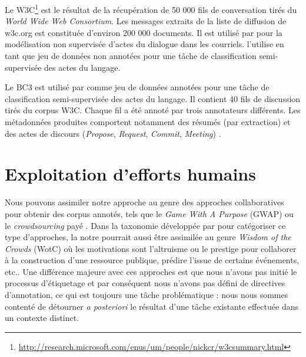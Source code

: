 Le W3C\footnote{\url{http://research.microsoft.com/enus/um/people/nickcr/w3csummary.html}} est le résultat de la récupération de 50 000 fils de conversation tirés du \textit{World Wide Web Consortium}. Les messages extraits de la liste de diffusion de w3c.org est constituée d'environ 200 000 documents. Il est utilisé par \cite{joty:2011:ijcai} pour la modélisation non supervisée d'actes du dialogue dans les courriels. \cite{joty:2013:sigdial} l'utilise en tant que jeu de données non annotées pour une tâche de classification semi-supervisée des actes du langage.

Le BC3 est utilisé par \cite{joty:2013:sigdial} comme jeu de données annotées pour une tâche de classification semi-supervisée des actes du langage. Il contient 40 fils de discussion tirés du corpus W3C. Chaque fil a été annoté par trois annotateurs différents. Les métadonnées produites comportent notamment des résumés (par extraction) et des actes de discours (\textit{Propose}, \textit{Request}, \textit{Commit}, \textit{Meeting}) \cite{JanAAAI08}.

\section{Exploitation d'efforts humains}

Nous pouvons assimiler notre approche au genre des approches collaboratives pour obtenir des corpus annotés, tels que le \textit{Game With A Purpose} (GWAP) \cite{ahn:2006:computer} ou le \textit{crowdsourcing} payé \cite{fort:2011:cl}. Dans la taxonomie développée par \cite{wang:2013:lre} pour catégoriser ce type d'approches, la notre pourrait aussi être assimilée au genre \textit{Wisdom of the Crowds} (WotC) où les motivations sont l'altruisme ou le prestige pour collaborer à la construction d'une ressource publique, prédire l'issue de certains événements, etc..  Une différence majeure avec ces approches est que nous n'avons pas initié le processus d'étiquetage et par conséquent nous n'avons pas défini de directives d'annotation, ce qui est toujours une tâche problématique : nous nous sommes contenté de détourner \textit{a posteriori} le résultat d'une tâche existante effectuée dans un contexte distinct.
